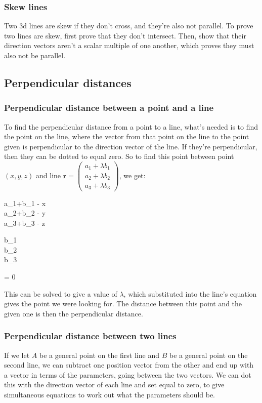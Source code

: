 \subsubsection{Skew lines}
Two 3d lines are skew if they don't cross, and they're also not parallel. To prove two lines are skew, first prove that they don't intersect. Then, show that their direction vectors aren't a scalar multiple of one another, which proves they must also not be parallel.

\subsection{Perpendicular distances}
\subsubsection{Perpendicular distance between a point and a line}
To find the perpendicular distance from a point to a line, what's needed is to find the point on the line, where the vector from that point on the line to the point given is perpendicular to the direction vector of the line. If they're perpendicular, then they can be dotted to equal zero. So to find this point between point $(x, y, z)$ and line $\mathbf{r}=\begin{pmatrix}a_1+\lambda b_1\\a_2+\lambda b_2\\a_3+\lambda b_3\end{pmatrix}$, we get:

\begin{ea}
	\begin{pmatrix}a_1+\lambda b_1 - x\\a_2+\lambda b_2 - y\\a_3+\lambda b_3 - z\end{pmatrix} \cdot \begin{pmatrix}b_1\\b_2\\b_3\end{pmatrix} = 0
\end{ea}

This can be solved to give a value of $\lambda$, which substituted into the line's equation gives the point we were looking for. The distance between this point and the given one is then the perpendicular distance.

\subsubsection{Perpendicular distance between two lines}
If we let $A$ be a general point on the first line and $B$ be a general point on the second line, we can subtract one position vector from the other and end up with a vector in terms of the parameters, going between the two vectors. We can dot this with the direction vector of each line and set equal to zero, to give simultaneous equations to work out what the parameters should be.

